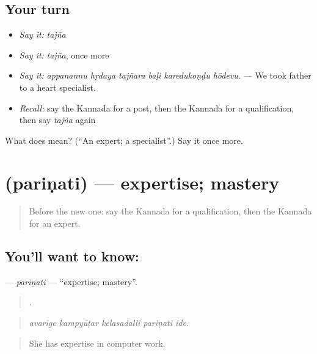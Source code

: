\subsection*{Your turn}
\begin{itemize}
\raggedright
  \item \emph{Say it:} \emph{tajña}
  \item \emph{Say it:} \emph{tajña}, once more
  \item \emph{Say it:} \emph{appanannu hṛdaya tajñara baḷi karedukoṇḍu hōdevu.} — We took father to a heart specialist.
  \item \emph{Recall:} say the Kannada for a post, then the Kannada for a qualification, then say \emph{tajña} again
\end{itemize}

\begin{tcolorbox}[breakable,colback=teal!4,colframe=teal!35!black,title={Before you move on}]
What does  mean? (\textquotedblleft{}An expert; a specialist\textquotedblright{}.) Say it once more.
\end{tcolorbox}
\section[\texorpdfstring{\kn{ಪರಿಣತಿ} (pariṇati)}{ಪರಿಣತಿ (pariṇati)}]{ (pariṇati) — expertise; mastery}

\label{lesson:KA-C516-parinati}



\begin{quote}
Before the new one: say the Kannada for a qualification, then the Kannada for an expert.
\end{quote}

\subsection*{You'll want to know: }
\textbf{} — \emph{pariṇati} — \textquotedblleft{}expertise; mastery\textquotedblright{}.

\begin{quote}
    .
\end{quote}

\begin{quote}
\emph{avarige kampyūṭar kelasadalli pariṇati ide.}
\end{quote}

\begin{quote}
She has expertise in computer work.
\end{quote}

